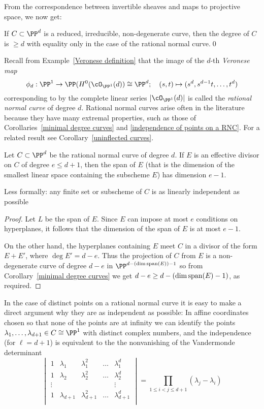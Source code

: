 From the correspondence between invertible sheaves and maps to projective space, we now get:
\begin{corollary}\label{minimal degree curves}
If $C\subset \PP^d$ is a reduced, irreducible, non-degenerate curve, then the degree of $C$ is $\geq d$ with equality only in the case
of the rational normal curve.\qed
\end{corollary}

Recall from Example~\ref{Veronese definition} that the image of the $d$-th \emph{Veronese map}  
$$
\phi_d: \PP^1 \to \PP(H^0(\cO_{\PP^1}(d)) \cong \PP^d; \quad (s,t) \mapsto (s^d, s^{d-1}t, \dots, t^d)
$$
corresponding to by the complete linear series $|\cO_{\PP^1}(d)|$ is called the \emph{rational normal curve} of degree $d$. Rational normal curves arise often in the literature because they have many extremal properties, such as those of Corollaries~\ref{minimal degree curves} and \ref{independence of points on a RNC}. For a related result see Corollary~\ref{uninflected curves}.

\begin{corollary}\label{independence of points on a RNC}
Let $C\subset \PP^d$ be the rational normal curve of degree $d$. If $E$ is an effective divisor on $C$ of degree $e\leq d+1$, then the
span of $E$ (that is the dimension of the smallest linear space containing the subscheme $E$) has dimension $e-1$.
\end{corollary}
Less formally: any finite set or subscheme of $C$ is as linearly independent as possible

\begin{proof}
Let $L$ be the span of $E$. Since $E$ can impose at most $e$ conditions on hyperplanes, it follows that the dimension of the span of $E$ is
at most $e-1$.

On the other hand, the hyperplanes containing $E$ meet $C$ in a divisor of the form $E+E'$, where
$\deg E' = d-e$. Thus the projection of $C$ from $E$ is a non-degenerate curve of degree $d-e$ in $\PP^{d-(\dim {\rm span}(E))-1}$
so from Corollary~\ref{minimal degree curves} we get $d-e \geq d-(\dim {\rm span}(E)-1)$, as required.
\end{proof}

In the case of distinct points on a rational normal curve
it is easy to make a direct argument why they are as independent as possible: In affine coordinates chosen so that none of the points are
at infinity we can identify the points $\lambda_1,\dots,\lambda_{d+1} \in C \cong \PP^1$ with distinct complex numbers, and the independence (for $\ell = d+1$) is equivalent to the the nonvanishing of the Vandermonde determinant
$$
\begin{vmatrix}
1 & \lambda_1 & \lambda_1^2 & \dots & \lambda_1^d \\
1 & \lambda_2 & \lambda_2^2 & \dots & \lambda_2^d \\
\vdots & & & & \vdots \\
1 & \lambda_{d+1} & \lambda_{d+1}^2 & \dots & \lambda_{d+1}^d \\
\end{vmatrix}
= \prod_{1 \leq i < j \leq d+1} (\lambda_j - \lambda_i)
$$


